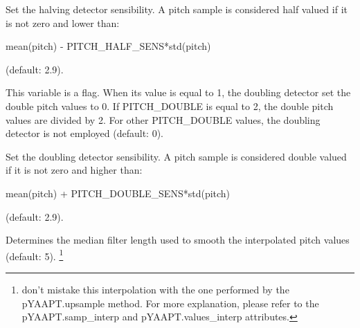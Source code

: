 \documentclass[letterpaper,10pt,english]{sphinxmanual}
\begin{document}

\begin{fulllineitems}
\label{pYAAPT:PitchObj.PITCH_HALF_SENS}
Set the halving detector sensibility. A pitch sample is considered half valued if it is not zero and lower than:

mean(pitch) - PITCH\_HALF\_SENS*std(pitch)

(default: 2.9).

\end{fulllineitems}


\begin{fulllineitems}
\label{pYAAPT:PitchObj.PITCH_DOUBLE}
This variable is a flag. When its value is equal to 1, the doubling detector set the double pitch values to 0. If PITCH\_DOUBLE is equal to 2, the double pitch values are divided by 2. For other PITCH\_DOUBLE values, the doubling detector is not employed (default: 0).

\end{fulllineitems}


\begin{fulllineitems}
\label{pYAAPT:PitchObj.PITCH_DOUBLE_SENS}
Set the doubling detector sensibility. A pitch sample is considered double valued if it is not zero and higher than:

mean(pitch) + PITCH\_DOUBLE\_SENS*std(pitch)

(default: 2.9).

\end{fulllineitems}


\begin{fulllineitems}
\label{pYAAPT:PitchObj.SMOOTH_FACTOR}
Determines the median filter length used to smooth the interpolated pitch values (default: 5). \footnote{
don't mistake this interpolation with the one performed by the pYAAPT.upsample method. For more explanation, please refer to the pYAAPT.samp\_interp and pYAAPT.values\_interp attributes.
}

\end{fulllineitems}
\end{document}
